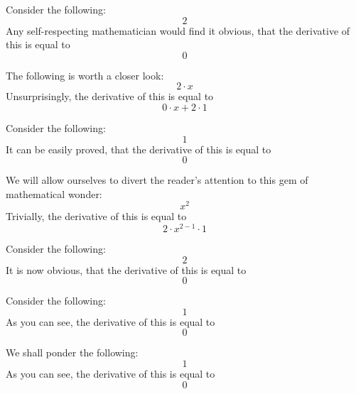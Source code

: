 \documentclass{article}
\begin{document}
Consider the following:
\begin{equation}
2 
\end{equation}
Any self-respecting mathematician would find it obvious, that the derivative of this is equal to
\begin{equation}
0 
\end{equation}

The following is worth a closer look:
\begin{equation}
2 \cdot x 
\end{equation}
Unsurprisingly, the derivative of this is equal to
\begin{equation}
0 \cdot x + 2 \cdot 1 
\end{equation}

Consider the following:
\begin{equation}
1 
\end{equation}
It can be easily proved, that the derivative of this is equal to
\begin{equation}
0 
\end{equation}

We will allow ourselves to divert the reader's attention to this gem of mathematical wonder:
\begin{equation}
x ^{2 } 
\end{equation}
Trivially, the derivative of this is equal to
\begin{equation}
2 \cdot x ^{2 - 1 } \cdot 1 
\end{equation}

Consider the following:
\begin{equation}
2 
\end{equation}
It is now obvious, that the derivative of this is equal to
\begin{equation}
0 
\end{equation}

Consider the following:
\begin{equation}
1 
\end{equation}
As you can see, the derivative of this is equal to
\begin{equation}
0 
\end{equation}

We shall ponder the following:
\begin{equation}
1 
\end{equation}
As you can see, the derivative of this is equal to
\begin{equation}
0 
\end{equation}
\end{document}
